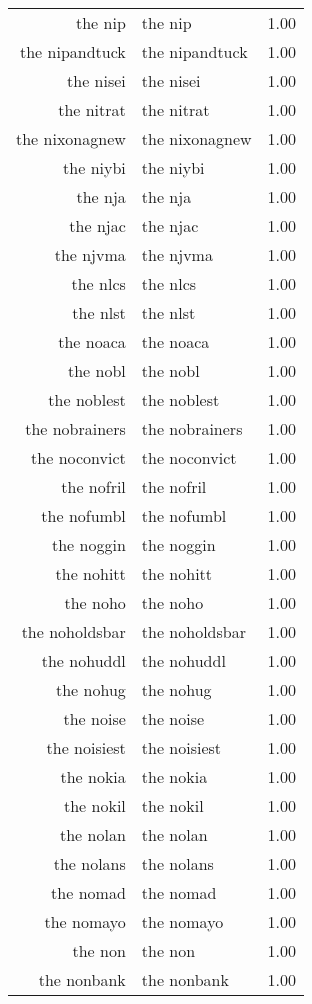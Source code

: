 \begin{table}[ht]
\begin{tabular}{rlr}
  the nip & the nip & 1.00 \\ 
  the nipandtuck & the nipandtuck & 1.00 \\ 
  the nisei & the nisei & 1.00 \\ 
  the nitrat & the nitrat & 1.00 \\ 
  the nixonagnew & the nixonagnew & 1.00 \\ 
  the niybi & the niybi & 1.00 \\ 
  the nja & the nja & 1.00 \\ 
  the njac & the njac & 1.00 \\ 
  the njvma & the njvma & 1.00 \\ 
  the nlcs & the nlcs & 1.00 \\ 
  the nlst & the nlst & 1.00 \\ 
  the noaca & the noaca & 1.00 \\ 
  the nobl & the nobl & 1.00 \\ 
  the noblest & the noblest & 1.00 \\ 
  the nobrainers & the nobrainers & 1.00 \\ 
  the noconvict & the noconvict & 1.00 \\ 
  the nofril & the nofril & 1.00 \\ 
  the nofumbl & the nofumbl & 1.00 \\ 
  the noggin & the noggin & 1.00 \\ 
  the nohitt & the nohitt & 1.00 \\ 
  the noho & the noho & 1.00 \\ 
  the noholdsbar & the noholdsbar & 1.00 \\ 
  the nohuddl & the nohuddl & 1.00 \\ 
  the nohug & the nohug & 1.00 \\ 
  the noise & the noise & 1.00 \\ 
  the noisiest & the noisiest & 1.00 \\ 
  the nokia & the nokia & 1.00 \\ 
  the nokil & the nokil & 1.00 \\ 
  the nolan & the nolan & 1.00 \\ 
  the nolans & the nolans & 1.00 \\ 
  the nomad & the nomad & 1.00 \\ 
  the nomayo & the nomayo & 1.00 \\ 
  the non & the non & 1.00 \\ 
  the nonbank & the nonbank & 1.00 \\ 

\end{tabular}
\end{table}
